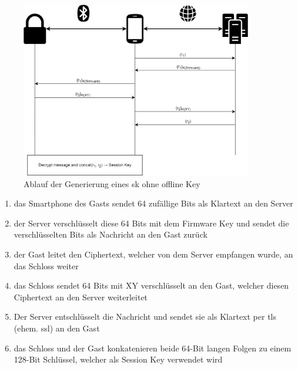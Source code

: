         \begin{figure}[!htbp]
    		\centering
    		\includegraphics[width=0.9\textwidth]{graphics/online_key.png}
    		\caption[Generierung eines Session Keys ohne Offline Key]{Ablauf der Generierung eines \gls{sk} ohne offline Key\cite{Fuller2017}}
    		\label{fig:online_key}
    	\end{figure}
        
        \begin{enumerate}[noitemsep]
            \item das Smartphone des Gasts sendet 64 zufällige Bits als Klartext an den Server
            \item der Server verschlüsselt diese 64 Bits mit dem Firmware Key und sendet die verschlüsselten Bits als Nachricht an den Gast zurück
            \item der Gast leitet den Ciphertext, welcher von dem Server empfangen wurde, an das Schloss weiter
            \item das Schloss sendet 64 Bits mit XY verschlüsselt an den Gast, welcher diesen Ciphertext an den Server weiterleitet
            \item Der Server entschlüsselt die Nachricht und sendet sie als Klartext per \gls{tls} (ehem. \gls{ssl}) an den Gast
            \item das Schloss und der Gast konkatenieren beide 64-Bit langen Folgen zu einem 128-Bit Schlüssel, welcher als Session Key verwendet wird
        \end{enumerate}

